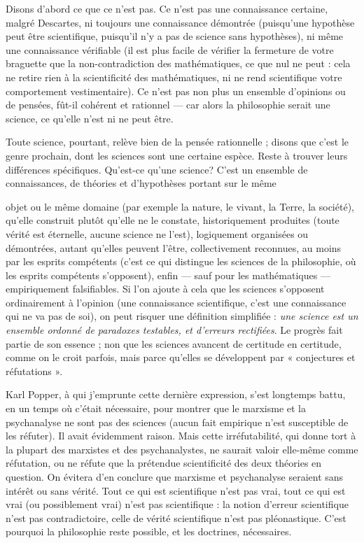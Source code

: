 Disons d’abord ce que ce n’est pas. Ce n’est pas une connaissance certaine,
malgré Descartes, ni toujours une connaissance démontrée (puisqu’une hypothèse
peut être scientifique, puisqu'il n’y a pas de science sans hypothèses), ni
même une connaissance vérifiable (il est plus facile de vérifier la fermeture de
votre braguette que la non-contradiction des mathématiques, ce que nul ne
peut : cela ne retire rien à la scientificité des mathématiques, ni ne rend scientifique
votre comportement vestimentaire). Ce n’est pas non plus un ensemble
d'opinions ou de pensées, fût-il cohérent et rationnel — car alors la philosophie
serait une science, ce qu’elle n’est ni ne peut être.

Toute science, pourtant, relève bien de la pensée rationnelle ; disons que
c'est le genre prochain, dont les sciences sont une certaine espèce. Reste à
trouver leurs différences spécifiques. Qu'est-ce qu’une science? C’est un
ensemble de connaissances, de théories et d’hypothèses portant sur le même

objet ou le même domaine (par exemple la nature, le vivant, la Terre, la
société), qu’elle construit plutôt qu’elle ne le constate, historiquement produites
(toute vérité est éternelle, aucune science ne l’est), logiquement organisées
ou démontrées, autant qu’elles peuvent l'être, collectivement reconnues, au
moins par les esprits compétents (c’est ce qui distingue les sciences de la philosophie,
où les esprits compétents s’opposent), enfin — sauf pour les mathématiques —
empiriquement falsifiables. Si l’on ajoute à cela que les sciences s’opposent
ordinairement à l’opinion (une connaissance scientifique, c'est une
connaissance qui ne va pas de soi), on peut risquer une définition simplifiée :
{\it une science est un ensemble ordonné de paradoxes testables, et d'erreurs rectifiées}. Le
progrès fait partie de son essence ; non que les sciences avancent de certitude en
certitude, comme on le croit parfois, mais parce qu’elles se développent par
« conjectures et réfutations ».

Karl Popper, à qui j'emprunte cette dernière expression, s’est longtemps
battu, en un temps où c'était nécessaire, pour montrer que le marxisme et la
psychanalyse ne sont pas des sciences (aucun fait empirique n’est susceptible de
les réfuter). Il avait évidemment raison. Mais cette irréfutabilité, qui donne tort
à la plupart des marxistes et des psychanalystes, ne saurait valoir elle-même
comme réfutation, ou ne réfute que la prétendue scientificité des deux théories
en question. On évitera d’en conclure que marxisme et psychanalyse seraient
sans intérêt ou sans vérité. Tout ce qui est scientifique n’est pas vrai, tout ce qui
est vrai (ou possiblement vrai) n’est pas scientifique : la notion d’erreur scientifique
n’est pas contradictoire, celle de vérité scientifique n’est pas pléonastique.
C’est pourquoi la philosophie reste possible, et les doctrines, nécessaires.

